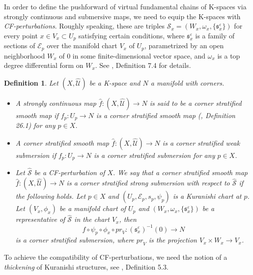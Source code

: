 \documentclass[a4paper]{article}
\newtheorem{definition}[theorem]{Definition}
\numberwithin{equation}{section}
\begin{document}
In order to define the pushforward of virtual fundamental chains of K-spaces via strongly continuous and submersive maps, we need to equip the K-spaces with \textit{CF-perturbations}. Roughly speaking, these are triples $\mathcal{S}_x=\left(W_x,\omega_x,\{\mathfrak{s}_x^\varepsilon\}\right)$ for every point $x\in V_x\subset U_p$ satisfying certain conditions, where $\mathfrak{s}_x^\varepsilon$ is a family of sections of $\mathcal{E}_p$ over the manifold chart $V_x$ of $U_p$, parametrized by an open neighborhood $W_x$ of $0$ in some finite-dimensional vector space, and $\omega_x$ is a top degree differential form on $W_x$. See \cite{fooo4}, Definition 7.4 for details. 

\begin{definition}
Let $(X,\widehat{\mathcal{U}})$ be a K-space and $N$ a manifold with corners.
\begin{itemize}
	\item[(i)] A strongly continuous map $\hat{f}: (X,\widehat{\mathcal{U}})\rightarrow N$ is said to be a corner stratified smooth map if $f_p:U_p\rightarrow N$ is a corner stratified smooth map (\cite{fooo4}, Definition 26.1) for any $p\in X$.
	\item[(ii)] A corner stratified smooth map $\hat{f}: (X,\widehat{\mathcal{U}})\rightarrow N$ is a corner stratified weak submersion if $f_p:U_p\rightarrow N$ is a corner stratified submersion for any $p\in X$.
	\item[(iii)] Let $\widehat{\mathcal{S}}$ be a CF-perturbation of $X$. We say that a corner stratified smooth map $\hat{f}: (X,\widehat{\mathcal{U}})\rightarrow N$ is a corner stratified strong submersion with respect to $\widehat{\mathcal{S}}$ if the following holds. Let $p\in X$ and $(U_p,\mathcal{E}_p,s_p,\psi_p)$ is a Kuranishi chart at $p$. Let $(V_x,\phi_x)$ be a manifold chart of $U_p$ and $\left(W_x,\omega_x,\{\mathfrak{s}_x^\varepsilon\}\right)$ be a representative of $\widehat{\mathcal{S}}$ in the chart $V_x$, then
	\begin{equation}
	f\circ\psi_p\circ\phi_x\circ\mathit{pr}_V:(\mathfrak{s}_x^\varepsilon)^{-1}(0)\rightarrow N
	\end{equation}
    is a corner stratified submersion, where $\mathit{pr}_V$ is the projection $V_x\times W_x\rightarrow V_x$.
\end{itemize}
\end{definition}

To achieve the compatibility of CF-perturbations, we need the notion of a \textit{thickening} of Kuranishi structures, see \cite{fooo4}, Definition 5.3.
\end{document}
